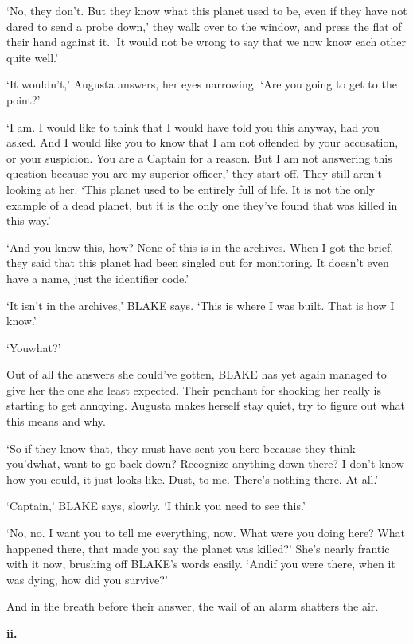 `No, they don't. But they know what this planet used to be, even if
they have not dared to send a probe down,' they walk over to the
window, and press the flat of their hand against it. `It would not be
wrong to say that we now know each other quite well.'

`It wouldn't,' Augusta answers, her eyes narrowing. `Are you going to
get to the point?'

`I am. I would like to think that I would have told you this anyway,
had you asked. And I would like you to know that I am not offended by
your accusation, or your suspicion. You are a Captain for a
reason. But I am not answering this question because you are my
superior officer,' they start off. They still aren't looking at
her. `This planet used to be entirely full of life. It is not the only
example of a dead planet, but it is the only one they've found that
was killed in this way.'

`And you know this, how? None of this is in the archives. When I got
the brief, they said that this planet had been singled out for
monitoring. It doesn't even have a name, just the identifier code.'

`It isn't in the archives,' BLAKE says. `This is where I was
built. That is how I know.'

`You\textemdash what?'

Out of all the answers she could've gotten, BLAKE has yet again
managed to give her the one she least expected. Their penchant for
shocking her really is starting to get annoying. Augusta makes herself
stay quiet, try to figure out what this means and why.

`So if they know that, they must have sent you here because they think
you'd\textemdash what, want to go back down? Recognize anything
down there? I don't know how you could, it just looks like. Dust, to
me. There's nothing there. At all.'

`Captain,' BLAKE says, slowly. `I think you need to see this.'

`No, no. I want you to tell me everything, now. What were you doing
here? What happened there, that made you say the planet was killed?'
She's nearly frantic with it now, brushing off BLAKE's words
easily. `And\textemdash if you were there, when it was dying, how
did you survive?'

And in the breath before their answer, the wail of an alarm shatters
the air.

\clearpage\textbf{ii.}

